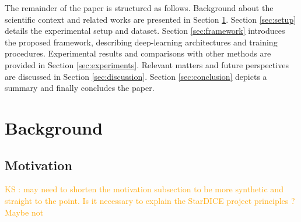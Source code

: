 \documentclass[amt, article]{copernicus}
\begin{document}
The remainder of the paper is structured as follows. Background about the scientific context and related works are presented in Section \ref{sec:background}. Section \ref{sec:setup} details the experimental setup and dataset. Section \ref{sec:framework} introduces the proposed framework, describing deep-learning architectures and training procedures. Experimental results and comparisons with other methods are provided in Section \ref{sec:experiments}. Relevant matters and future perspectives are discussed in Section \ref{sec:discussion}. Section \ref{sec:conclusion} depicts a summary and finally concludes the paper.

\section{Background}
\label{sec:background}

\subsection{Motivation}

\textcolor{orange}{KS : may need to shorten the motivation subsection to be more synthetic and straight to the point. Is it necessary to explain the StarDICE project principles ? Maybe not}
\end{document}
